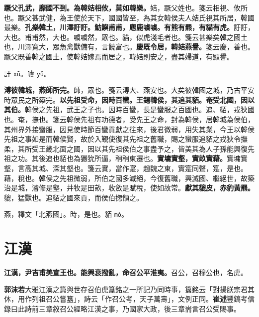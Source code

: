 \textbf{蹶父孔武，靡國不到。為韓姞相攸，莫如韓樂。}{\footnotesize 姞，蹶父姓也。箋云相視、攸所也。蹶父甚武健，為王使於天下，國國皆至，為其女韓侯夫人姞氏視其所居，韓國最樂。}\textbf{孔樂韓土，川澤訏訏。魴鱮甫甫，麀鹿噳噳。有熊有羆，有貓有虎。}{\footnotesize 訏訏，大也。甫甫然，大也。噳噳然，眾也。貓，似虎淺毛者也。箋云甚樂矣韓之國土也，川澤寬大，眾魚禽獸備有，言饒富也。}\textbf{慶既令居，韓姞燕譽。}{\footnotesize 箋云慶，善也。蹶父既善韓之國土，使韓姞嫁焉而居之，韓姞則安之，盡其婦道，有顯譽。}

\begin{quoting}訏 \texttt{xū}。噳 \texttt{yǔ}。\end{quoting}

\textbf{溥彼韓城，燕師所完。}{\footnotesize 師，眾也。箋云溥大、燕安也。大矣彼韓國之城，乃古平安時眾民之所築完。}\textbf{以先祖受命，因時百蠻。王錫韓侯，其追其貊。奄受北國，因以其伯。}{\footnotesize 韓侯之先祖，武王之子也。因時百蠻，長是蠻服之百國也。追、貊，戎狄國也。奄，撫也。箋云韓侯先祖有功德者，受先王之命，封為韓侯，居韓城為侯伯，其州界外接蠻服，因見使時節百蠻貢獻之往來，後君微弱，用失其業，今王以韓侯先祖之事如是而韓侯賢，故於入覲使復其先祖之舊職，賜之蠻服追貊之戎狄令撫柔，其所受王畿北面之國，因以其先祖侯伯之事盡予之，皆美其為人子孫能興復先祖之功。其後追也貊也為玁狁所逼，稍稍東遷也。}\textbf{實墉實壑，實畝實藉。}{\footnotesize 實墉實壑，言高其城、深其壑也。箋云實，當作寔，趙魏之東，實寔同聲，寔，是也。藉，稅也。韓侯之先祖微弱，所伯之國多滅絕，今復舊職，興滅國、繼絕世，故築治是城，濬修是壑，井牧是田畝，收斂是賦稅，使如故常。}\textbf{獻其貔皮，赤豹黃羆。}{\footnotesize 貔，猛獸也。追貊之國來貢，而侯伯揔領之。}

\begin{quoting}燕，釋文「北燕國」。時，是也。貊 \texttt{mò}。\end{quoting}

\section{江漢}


\textbf{江漢，尹吉甫美宣王也。能興衰撥亂，命召公平淮夷。}{\footnotesize 召公，召穆公也，名虎。}

\begin{quoting}\textbf{郭沫若}大雅江漢之篇與世存召伯虎簋銘之一所記乃同時事，簋銘云「對揚朕宗君其休，用作列祖召公嘗簋」，詩云「作召公考，天子萬壽」，文例正同。\textbf{崔述}豐鎬考信錄曰此詩前三章敘召公經略江漢之事，乃國家大政，後三章耑言召公受賜事。\end{quoting}

